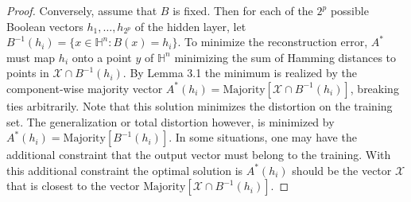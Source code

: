 \begin{proof}
    Conversely, assume that $B$ is fixed. Then for each of the $2^p$ possible Boolean vectors $h_1, \dots, h_{2^{p}}$ of the hidden layer, let $B^{-1}(h_i) = \{x \in \mathbb{H}^n : B(x) = h_i\}$. To minimize the reconstruction error, $A^*$ must map $h_i$ onto a point $y$ of $\mathbb{H}^n$ minimizing the sum of Hamming distances to points in $\mathcal{X} \cap B^{-1}(h_i)$. By Lemma 3.1 the minimum is realized by the component-wise majority vector $A^*(h_i) = \text{Majority}[\mathcal{X} \cap B^{-1}(h_i)]$, breaking ties arbitrarily. Note that this solution minimizes the distortion on the training set. The generalization or total distortion however, is minimized by $A^*(h_i) = \text{Majority}[B^{-1}(h_i)]$. In some situations, one may have the additional constraint that the output vector must belong to the training. With this additional constraint the optimal solution is $A^*(h_i)$ should be the vector $\mathcal{X}$ that is closest to the vector $\text{Majority}[\mathcal{X} \cap B^{-1}(h_i)]$. 
\end{proof}
